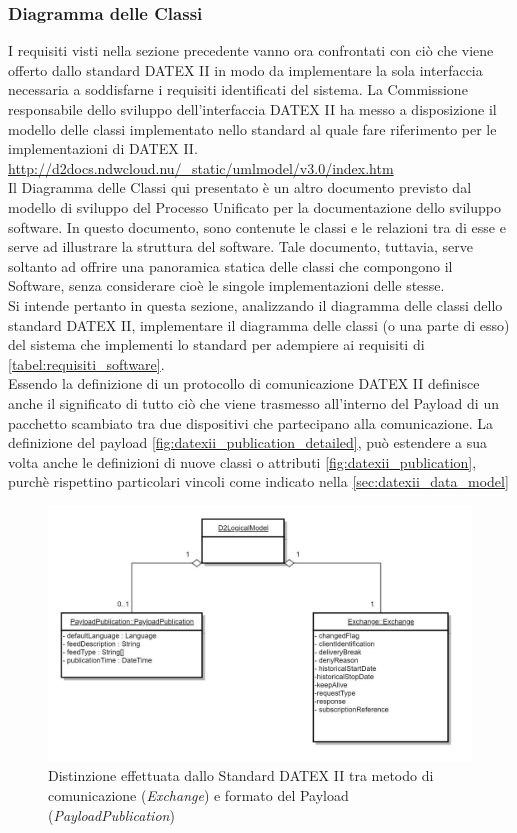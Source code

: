 \subsubsection{Diagramma delle Classi}
I requisiti visti nella sezione precedente vanno ora confrontati con ciò che viene offerto dallo standard DATEX II in modo da implementare la sola interfaccia necessaria a soddisfarne i requisiti identificati del sistema.
La Commissione responsabile dello sviluppo dell'interfaccia DATEX II ha messo a disposizione il modello delle classi implementato nello standard al quale fare riferimento per le implementazioni di DATEX II. \url{http://d2docs.ndwcloud.nu/_static/umlmodel/v3.0/index.htm}\\
Il Diagramma delle Classi qui presentato è un altro documento previsto dal modello di sviluppo del Processo Unificato per la documentazione dello sviluppo software. In questo documento, sono contenute le classi e le relazioni tra di esse e serve ad illustrare la struttura del software. Tale documento, tuttavia, serve soltanto ad offrire una panoramica statica delle classi che compongono il Software, senza considerare cioè le singole implementazioni delle stesse. \\
Si intende pertanto in questa sezione, analizzando il diagramma delle classi dello standard DATEX II, implementare il diagramma delle classi (o una parte di esso) del sistema che implementi lo standard per adempiere ai requisiti di \autoref{tabel:requisiti_software}.\\
Essendo la definizione di un protocollo di comunicazione DATEX II definisce anche il significato di tutto ciò che viene trasmesso all'interno del Payload di un pacchetto scambiato tra due dispositivi che partecipano alla comunicazione. La definizione del payload \autoref{fig:datexii_publication_detailed}, può estendere a sua volta anche le definizioni di nuove classi o attributi \autoref{fig:datexii_publication}, purchè rispettino particolari vincoli come indicato nella \autoref{sec:datexii_data_model}
\begin{figure}
	\begin{center}
		\includegraphics[width=0.6\columnwidth]{images/uml_1}
	\end{center}
	\caption{Distinzione effettuata dallo Standard DATEX II tra metodo di comunicazione (\textit{Exchange}) e formato del Payload (\textit{PayloadPublication})}
	\label{fig:uml_1}
\end{figure}
